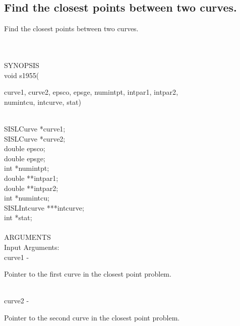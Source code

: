\subsection{Find the closest points between two curves.}
\begin{minipg1}
  Find the closest points between two curves.
\end{minipg1} \\ \\
SYNOPSIS\\
        \>void s1955(\begin{minipg3}
        {\fov curve1}, {\fov curve2}, {\fov epsco}, {\fov epsge}, {\fov numintpt},
        {\fov intpar1}, {\fov intpar2},\\ {\fov numintcu}, {\fov intcurve}, {\fov stat})
                \end{minipg3}\\[0.3ex]
                \>\>    SISLCurve       \>      *{\fov curve1};\\
                \>\>    SISLCurve       \>      *{\fov curve2};\\
                \>\>    double  \>      {\fov epsco};\\
                \>\>    double  \>      {\fov epsge};\\
                \>\>    int     \>      *{\fov numintpt};\\
                \>\>    double  \>      **{\fov intpar1};\\
                \>\>    double  \>      **{\fov intpar2};\\
                \>\>    int     \>      *{\fov numintcu};\\
                \>\>    SISLIntcurve \> ***{\fov intcurve};\\
                \>\>    int     \>      *{\fov stat};\\
\\
ARGUMENTS\\
        \>Input Arguments:\\
        \>\>    {\fov curve1}   \> - \> \begin{minipg2}
                                Pointer to the first curve in the closest point
                                        problem.
                                \end{minipg2}\\
        \>\>    {\fov curve2}   \> - \> \begin{minipg2}
                                Pointer to the second curve in the closest point
                                        problem.
                                \end{minipg2}\\[0.8ex]
